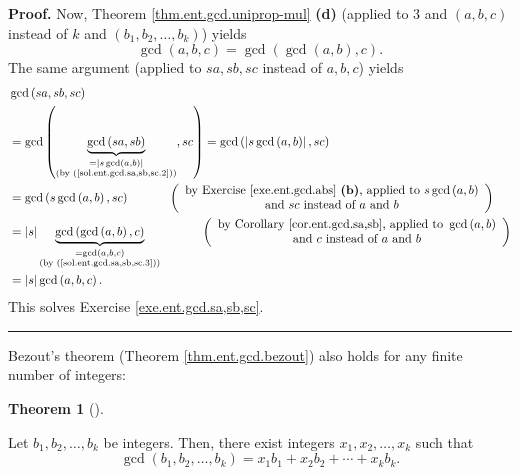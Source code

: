 \documentclass[numbers=enddot,12pt,final,onecolumn,notitlepage]{scrartcl}%
\numberwithin{exer}{subsection}
\theoremstyle{definition}
\newtheorem{theo}{Theorem}[subsection]
\newenvironment{theorem}[1][]
{\begin{theo}[#1]\begin{leftbar}}
{\end{leftbar}\end{theo}}
\newenvironment{fineprint}{\begin{small}}{\end{small}}
\newenvironment{proof}[1][Proof]{\noindent\textbf{#1.} }{\ \rule{0.5em}{0.5em}}
\begin{document}
\begin{fineprint}
\begin{proof}
Now, Theorem \ref{thm.ent.gcd.uniprop-mul} \textbf{(d)} (applied to $3$ and
$\left(  a,b,c\right)  $ instead of $k$ and $\left(  b_{1},b_{2},\ldots
,b_{k}\right)  $) yields%
\begin{equation}
\gcd\left(  a,b,c\right)  =\gcd\left(  \gcd\left(  a,b\right)  ,c\right)  .
\label{sol.ent.gcd.sa,sb,sc.3}%
\end{equation}
The same argument (applied to $sa,sb,sc$ instead of $a,b,c$) yields%
\begin{align*}
&  \gcd\left(  sa,sb,sc\right) \\
&  =\gcd\left(  \underbrace{\gcd\left(  sa,sb\right)  }_{\substack{=\left\vert
s\gcd\left(  a,b\right)  \right\vert \\\text{(by (\ref{sol.ent.gcd.sa,sb,sc.2}%
))}}},sc\right)  =\gcd\left(  \left\vert s\gcd\left(  a,b\right)  \right\vert
,sc\right) \\
&  =\gcd\left(  s\gcd\left(  a,b\right)  ,sc\right)
\ \ \ \ \ \ \ \ \ \ \left(
\begin{array}
[c]{c}%
\text{by Exercise \ref{exe.ent.gcd.abs} \textbf{(b)}, applied to }s\gcd\left(
a,b\right) \\
\text{and }sc\text{ instead of }a\text{ and }b
\end{array}
\right) \\
&  =\left\vert s\right\vert \underbrace{\gcd\left(  \gcd\left(  a,b\right)
,c\right)  }_{\substack{=\gcd\left(  a,b,c\right)  \\\text{(by
(\ref{sol.ent.gcd.sa,sb,sc.3}))}}}\ \ \ \ \ \ \ \ \ \ \left(
\begin{array}
[c]{c}%
\text{by Corollary \ref{cor.ent.gcd.sa,sb}, applied to }\gcd\left(  a,b\right)
\\
\text{and }c\text{ instead of }a\text{ and }b
\end{array}
\right) \\
&  =\left\vert s\right\vert \gcd\left(  a,b,c\right)  .
\end{align*}
This solves Exercise \ref{exe.ent.gcd.sa,sb,sc}.
\end{proof}
\end{fineprint}

Bezout's theorem (Theorem \ref{thm.ent.gcd.bezout}) also holds for any finite
number of integers:

\begin{theorem}
\label{thm.ent.gcd.bezout-mul}Let $b_{1},b_{2},\ldots,b_{k}$ be integers.
Then, there exist integers $x_{1},x_{2},\ldots,x_{k}$ such that%
\[
\gcd\left(  b_{1},b_{2},\ldots,b_{k}\right)  =x_{1}b_{1}+x_{2}b_{2}%
+\cdots+x_{k}b_{k}.
\]

\end{theorem}
\end{document}
